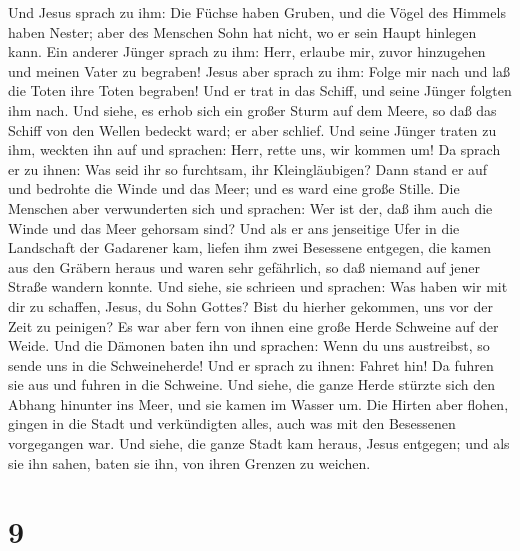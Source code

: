  Und Jesus sprach zu ihm: Die Füchse haben Gruben, und
die Vögel des Himmels haben Nester; aber des Menschen Sohn hat nicht, wo
er sein Haupt hinlegen kann.  Ein anderer Jünger sprach
zu ihm: Herr, erlaube mir, zuvor hinzugehen und meinen Vater zu
begraben!  Jesus aber sprach zu ihm: Folge mir nach und
laß die Toten ihre Toten begraben!  Und er trat in das
Schiff, und seine Jünger folgten ihm nach.  Und siehe, es
erhob sich ein großer Sturm auf dem Meere, so daß das Schiff von den
Wellen bedeckt ward; er aber schlief.  Und seine Jünger
traten zu ihm, weckten ihn auf und sprachen: Herr, rette uns, wir kommen
um!  Da sprach er zu ihnen: Was seid ihr so furchtsam,
ihr Kleingläubigen? Dann stand er auf und bedrohte die Winde und das
Meer; und es ward eine große Stille.  Die Menschen aber
verwunderten sich und sprachen: Wer ist der, daß ihm auch die Winde und
das Meer gehorsam sind?  Und als er ans jenseitige Ufer
in die Landschaft der Gadarener kam, liefen ihm zwei Besessene entgegen,
die kamen aus den Gräbern heraus und waren sehr gefährlich, so daß
niemand auf jener Straße wandern konnte.  Und siehe, sie
schrieen und sprachen: Was haben wir mit dir zu schaffen, Jesus, du Sohn
Gottes? Bist du hierher gekommen, uns vor der Zeit zu peinigen?
 Es war aber fern von ihnen eine große Herde Schweine auf
der Weide.  Und die Dämonen baten ihn und sprachen: Wenn
du uns austreibst, so sende uns in die Schweineherde! 
Und er sprach zu ihnen: Fahret hin! Da fuhren sie aus und fuhren in die
Schweine. Und siehe, die ganze Herde stürzte sich den Abhang hinunter
ins Meer, und sie kamen im Wasser um.  Die Hirten aber
flohen, gingen in die Stadt und verkündigten alles, auch was mit den
Besessenen vorgegangen war.  Und siehe, die ganze Stadt
kam heraus, Jesus entgegen; und als sie ihn sahen, baten sie ihn, von
ihren Grenzen zu weichen.

\hypertarget{section-8}{%
\section{9}\label{section-8}}

